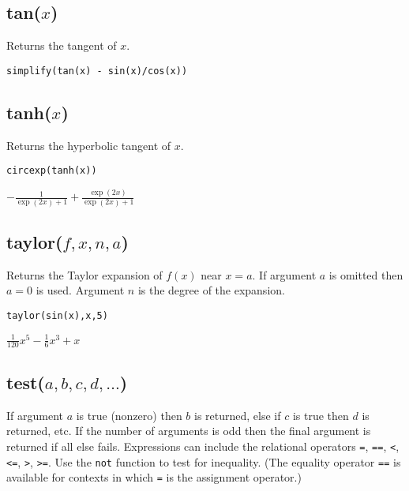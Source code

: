\subsection*{tan($x$)}

Returns the tangent of $x$.

{\color{blue}
\begin{verbatim}
simplify(tan(x) - sin(x)/cos(x))
\end{verbatim}
}


\subsection*{tanh($x$)}

Returns the hyperbolic tangent of $x$.

{\color{blue}
\begin{verbatim}
circexp(tanh(x))
\end{verbatim}
}

\noindent
$\displaystyle -\frac{1}{\exp(2x)+1}+\frac{\exp(2x)}{\exp(2x)+1}$

\subsection*{taylor($f,x,n,a$)}

Returns the Taylor expansion of $f(x)$ near $x=a$.
If argument $a$ is omitted then $a=0$ is used.
Argument $n$ is the degree of the expansion.

{\color{blue}
\begin{verbatim}
taylor(sin(x),x,5)
\end{verbatim}
}

\noindent
$\displaystyle \tfrac{1}{120}x^5-\tfrac{1}{6}x^3+x$

\subsection*{test($a,b,c,d,\ldots$)}

If argument $a$ is true (nonzero) then $b$ is returned, else if $c$ is true then $d$ is returned, etc.
If the number of arguments is odd then the final argument is returned if all else fails.
Expressions can include the relational operators
\verb$=$,
\verb$==$,
\verb$<$,
\verb$<=$,
\verb$>$,
\verb$>=$.
Use the
\verb$not$
function to test for inequality.
(The equality operator
\verb$==$
is available for contexts in which
\verb$=$
is the assignment operator.)

